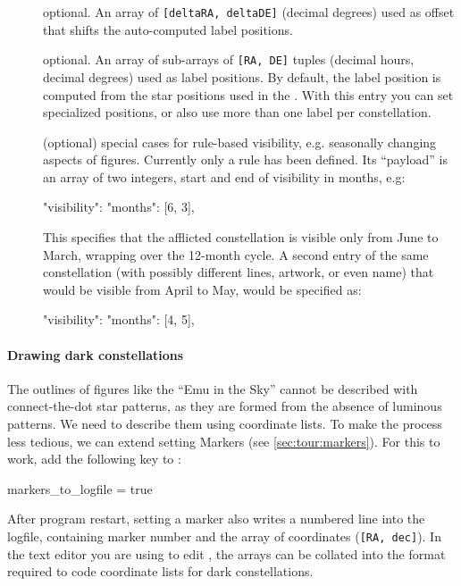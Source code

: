\begin{description}
\item[] optional. An array of \texttt{[deltaRA, deltaDE]} (decimal degrees)
                            used as offset that shifts the auto-computed label positions. 

\item[] optional. An array of sub-arrays of \texttt{[RA, DE]} tuples (decimal hours, decimal degrees) used as label positions. 
                               By default, the label position is computed from the star positions used in the . 
			                   With this entry you can set specialized positions, or also use more than one label per constellation. 
\item[] (optional) special cases for rule-based visibility, e.g. seasonally changing aspects of figures. 
	Currently only a  rule has been defined. 
	Its ``payload'' is an array of two integers, start and end of visibility in months, e.g:

	\begin{jsonfile}
"visibility": {"months": [6, 3]},
	\end{jsonfile}
%
This specifies that the afflicted constellation is visible only from June to March, wrapping over the 12-month cycle. 
A second entry of the same constellation (with possibly different lines, artwork, or even name) 
that would be visible from April to May, would be specified as:
\begin{jsonfile}
"visibility": {"months": [4, 5]},
\end{jsonfile}
\end{description}


\paragraph{Drawing dark constellations}\label{SC:constellations:dark:markers}
The outlines of figures like the ``Emu in the Sky'' cannot be described with connect-the-dot star patterns, 
as they are formed from the absence of luminous patterns. We need to describe them using coordinate lists. 
To make the process less tedious, we can extend setting Markers (see \ref{sec:tour:markers}). 
For this to work, add the following key to :
\begin{configfile}
[devel]
markers_to_logfile = true
\end{configfile}
After program restart, setting a marker also writes a numbered line into the logfile, 
containing marker number and the array of coordinates (\texttt{[RA, dec]}). 
In the text editor you are using to edit , 
the arrays can be collated into the format required to code coordinate lists for dark constellations.


